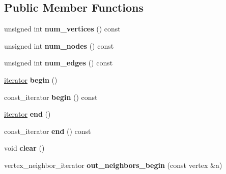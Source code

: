 \subsection*{Public Member Functions}
\begin{DoxyCompactItemize}
\item 
\mbox{\label{class_n_graph_1_1t_graph_a6aff4cfa2819f372ce4c7030c9709b82}} 
unsigned int {\bfseries num\+\_\+vertices} () const
\item 
\mbox{\label{class_n_graph_1_1t_graph_a5bbc421c6e9181fbd42ca1255b6fa739}} 
unsigned int {\bfseries num\+\_\+nodes} () const
\item 
\mbox{\label{class_n_graph_1_1t_graph_a25a5ca5600c3c4d4ae58f945981b5561}} 
unsigned int {\bfseries num\+\_\+edges} () const
\item 
\mbox{\label{class_n_graph_1_1t_graph_a1fa503849355f65f3d235b895a3f6086}} 
\mbox{\hyperlink{class_n_graph_1_1t_graph_a6e446a33b74e5c0c39fb6c50a4f07cec}{iterator}} {\bfseries begin} ()
\item 
\mbox{\label{class_n_graph_1_1t_graph_a957235ebde0cfda1bdfacdd0db212d73}} 
const\+\_\+iterator {\bfseries begin} () const
\item 
\mbox{\label{class_n_graph_1_1t_graph_a78775c7c87001e8ceb5668cec6d40dfb}} 
\mbox{\hyperlink{class_n_graph_1_1t_graph_a6e446a33b74e5c0c39fb6c50a4f07cec}{iterator}} {\bfseries end} ()
\item 
\mbox{\label{class_n_graph_1_1t_graph_aca77137373df2e5313f434326ffc355a}} 
const\+\_\+iterator {\bfseries end} () const
\item 
\mbox{\label{class_n_graph_1_1t_graph_add822443b93ee9ef745ee3b8ab12065b}} 
void {\bfseries clear} ()
\item 
\mbox{\label{class_n_graph_1_1t_graph_af4aaf8e70f041bea0759caa9133f5fe6}} 
vertex\+\_\+neighbor\+\_\+iterator {\bfseries out\+\_\+neighbors\+\_\+begin} (const vertex \&a)
\item 

\end{DoxyCompactItemize}
